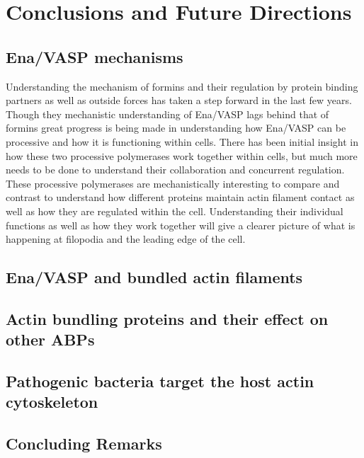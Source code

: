 \chapter{Conclusions and Future Directions}\label{ch:conclusions}

\section{Ena/VASP mechanisms}\label{ena-mechanism-conclusions}
Understanding the mechanism of formins and their regulation by protein binding partners as well as outside forces has taken a step forward in the last few years. Though they mechanistic understanding of Ena/VASP lags behind that of formins great progress is being made in understanding how Ena/VASP can be processive and how it is functioning within cells. There has been initial insight in how these two processive polymerases work together within cells, but much more needs to be done to understand their collaboration and concurrent regulation. These processive polymerases are mechanistically interesting to compare and contrast to understand how different proteins maintain actin filament contact as well as how they are regulated within the cell. Understanding their individual functions as well as how they work together will give a clearer picture of what is happening at filopodia and the leading edge of the cell. 

\section{Ena/VASP and bundled actin filaments}\label{ena-bundles-conclusions}

\section{Actin bundling proteins and their effect on other ABPs}\label{bundler-conclusions}

\section{Pathogenic bacteria target the host actin cytoskeleton}\label{bacteria-conclusions}

\section{Concluding Remarks}\label{final-conclusions}
